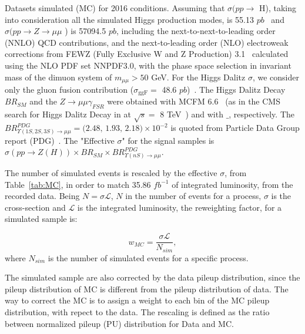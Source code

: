 \begin{table}[htp]
\begin{center}
\caption{Datasets simulated (MC) for 2016 conditions. Assuming that $\sigma (pp\rightarrow$ H), taking into consideration all the simulated Higgs production modes, is 55.13 $pb$~\cite{CERNYellowReportPageAt13TeV} and  $\sigma (pp\rightarrow Z \rightarrow \mu\mu$ ) is 57094.5 $pb$, including the next-to-next-to-leading order
(NNLO) QCD contributions, and the next-to-leading order (NLO) electroweak corrections from FEWZ (Fully Exclusive W and Z Production) 3.1~\cite{FEWZ} calculated using the NLO PDF set NNPDF3.0, with the phase space selection in invariant mass of the dimuon system of $m_{\mu\mu} > 50$ GeV. For the Higgs Dalitz $\sigma$, we consider only the gluon fusion contribution ($\sigma_{\text{ggF}}  = $ 48.6 $pb$)~\cite{CERNYellowReportPageAt13TeV}. The Higgs Dalitz Decay $BR_{SM}$ and the $Z \rightarrow \mu\mu\gamma_{FSR}$ were obtained with MCFM 6.6~\cite{CAMPBELL201010} (as in the CMS search for Higgs Dalitz Decay in at $\sqrt{s} =$ 8 TeV~\cite{dalitz_decay_8_Tev}) and with  $\_$\MCATNLO, respectively. The $BR^{PDG}_{\Upsilon(1S,2S,3S) \rightarrow \mu\mu} = \text{(2.48, 1.93, 2.18)} \times 10^{-2}$ is quoted from Particle Data Group report (PDG)~\cite{pdg_2020}. The "Effective $\sigma$" for the signal samples is $\sigma(pp \rightarrow Z(H)) \times BR_{SM} \times BR^{PDG}_{\Upsilon(nS) \rightarrow \mu\mu}$.}

\label{tab:MC}
\end{center}
\end{table}

The number of simulated events is rescaled by the effective $\sigma$, from Table~\ref{tab:MC}, in order to match 35.86 $fb^{-1}$ of integrated luminosity, from the recorded data. Being $N = \sigma \mathcal{L}$, $N$ in the number of events for a process, $\sigma$ is the cross-section and $\mathcal{L}$ is the integrated luminosity, the reweighting factor, for a simulated sample is:

\begin{equation}
\label{eqn:mc_weight}
w_{MC} = \frac{\sigma \mathcal{L}}{N_{sim}},
\end{equation}
where $N_{sim}$ is the number of simulated events for a specific process.

The simulated sample are also corrected by the data pileup distribution, since the pileup distribution of MC is different from the pileup distribution of data. The way to correct the MC is to assign a weight to each bin of the MC pileup distribution, with repect to the data. The rescaling is defined as the ratio between normalized pileup (PU) distribution for Data and MC.

